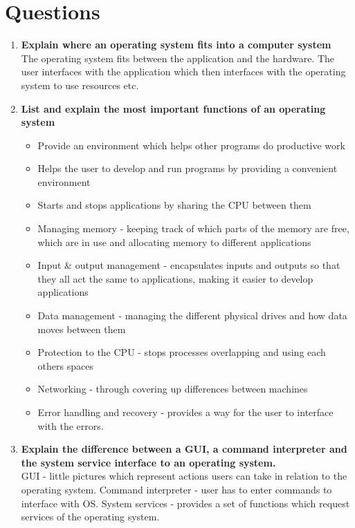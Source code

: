 
\section*{Questions}
\begin{enumerate}
    \item \textbf{Explain where an operating system fits into a computer system}\\
    The operating system fits between the application and the hardware. The user interfaces with the application which then interfaces with the operating system to use resources etc.
    \item \textbf{List and explain the most important functions of an operating system}
    \begin{itemize}
        \item Provide an environment which helps other programs do productive work
        \item Helps the user to develop and run programs by providing a convenient environment
        \item Starts and stops applications by sharing the CPU between them
        \item Managing memory - keeping track of which parts of the memory are free, which are in use and allocating memory to different applications
        \item Input \& output management - encapsulates inputs and outputs so that they all act the same to applications, making it easier to develop applications
        \item Data management - managing the different physical drives and how data moves between them
        \item Protection to the CPU - stops processes overlapping and using each others spaces
        \item Networking - through covering up differences between machines
        \item Error handling and recovery - provides a way for the user to interface with the errors.
    \end{itemize}
    \item \textbf{Explain the difference between a GUI, a command interpreter and the system service interface to an operating system. }\\
    GUI - little pictures which represent actions users can take in relation to the operating system. Command interpreter - user has to enter commands to interface with OS. System services - provides a set of functions which request services of the operating system.

\end{enumerate}
